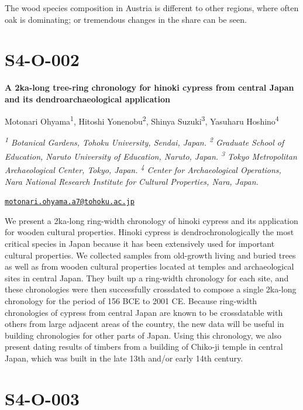 \documentclass[
]{book}
\begin{document}
The wood species composition in Austria is different to other regions, where often oak is dominating; or tremendous changes in the share can be seen.

\hypertarget{s4-o-002}{%
\section*{S4-O-002}\label{s4-o-002}}

\textbf{A 2ka-long tree-ring chronology for hinoki cypress from central Japan and its dendroarchaeological application}

Motonari Ohyama\textsuperscript{1}, Hitoshi Yonenobu\textsuperscript{2}, Shinya Suzuki\textsuperscript{3}, Yasuharu Hoshino\textsuperscript{4}

\emph{\textsuperscript{1} Botanical Gardens, Tohoku University, Sendai, Japan. \textsuperscript{2} Graduate School of Education, Naruto University of Education, Naruto, Japan. \textsuperscript{3} Tokyo Metropolitan Archaeological Center, Tokyo, Japan. \textsuperscript{4} Center for Archaeological Operations, Nara National Research Institute for Cultural Properties, Nara, Japan.}

\href{mailto:motonari.ohyama.a7@tohoku.ac.jp}{\nolinkurl{motonari.ohyama.a7@tohoku.ac.jp}}

We present a 2ka-long ring-width chronology of hinoki cypress and its application for wooden cultural properties. Hinoki cypress is dendrochronologically the most critical species in Japan because it has been extensively used for important cultural properties. We collected samples from old-growth living and buried trees as well as from wooden cultural properties located at temples and archaeological sites in central Japan. They built up a ring-width chronology for each site, and these chronologies were then successfully crossdated to compose a single 2ka-long chronology for the period of 156 BCE to 2001 CE. Because ring-width chronologies of cypress from central Japan are known to be crossdatable with others from large adjacent areas of the country, the new data will be useful in building chronologies for other parts of Japan. Using this chronology, we also present dating results of timbers from a building of Chiko-ji temple in central Japan, which was built in the late 13th and/or early 14th century.

\hypertarget{s4-o-003}{%
\section*{S4-O-003}\label{s4-o-003}}
\end{document}
